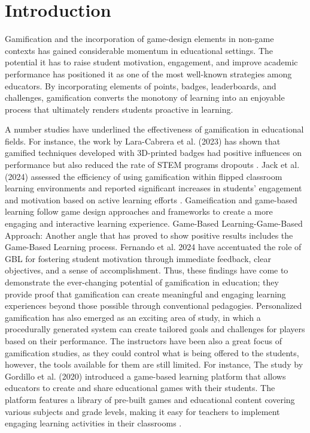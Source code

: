\chapter{Introduction}\label{chap:intro}

Gamification and the incorporation of game-design elements in non-game contexts has gained considerable momentum in educational settings. The potential it has to raise student motivation, engagement, and improve academic performance has positioned it as one of the most well-known strategies among educators. By incorporating elements of points, badges, leaderboards, and challenges, gamification converts the monotony of learning into an enjoyable process that ultimately renders students proactive in learning.

A number studies have underlined the effectiveness of gamification in educational fields. For instance, the work by Lara-Cabrera et al. (2023) has shown that gamified techniques developed with 3D-printed badges had positive influences on performance but also reduced the rate of STEM programs dropouts \cite{lara2023badges}. Jack et al. (2024) assessed the efficiency of using gamification within flipped classroom learning environments and reported significant increases in students' engagement and motivation based on active learning efforts \cite{jack2024gamification}. Gameification and game-based learning follow game design approaches and frameworks to create a more engaging and interactive learning experience.
Game-Based Learning-Game-Based Approach: Another angle that has proved to show positive results includes the Game-Based Learning process. Fernando et al. 2024 have accentuated the role of GBL for fostering student motivation through immediate feedback, clear objectives, and a sense of accomplishment. Thus, these findings have come to demonstrate the ever-changing potential of gamification in education; they provide proof that gamification can create meaningful and engaging learning experiences beyond those possible through conventional pedagogies. Personalized gamification has also emerged as an exciting area of study, in which a procedurally generated system can create tailored goals and challenges for players based on their performance. The instructors have been also a great focus of gamification studies, as they could control what is being offered to the students, however, the tools available for them are still limited. For instance, The study by Gordillo et al. (2020) introduced a game-based learning platform that allows educators to create and share educational games with their students. The platform features a library of pre-built games and educational content covering various subjects and grade levels, making it easy for teachers to implement engaging learning activities in their classrooms \cite{sgame2020}.

